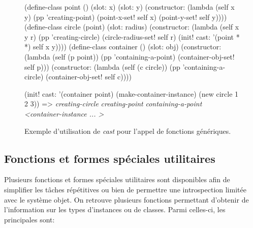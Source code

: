 \documentclass[12pt,oneside,letterpaper,francais]{book}
\newcommand{\schemeresult}[1]{{\it #1}}
\begin{document}
\begin{figure}[p!]
  \begin{schemecode}
(define-class point () (slot: x) (slot: y)
  (constructor: (lambda (self x y)
                  (pp 'creating-point)
                  (point-x-set! self x) (point-y-set! self y))))
(define-class circle (point) (slot: radius)
  (constructor: (lambda (self x y r)
                  (pp 'creating-circle)
                  (circle-radius-set! self r)
                  (init! cast: '(point * *) self x y))))
(define-class container () (slot: obj)
  (constructor: (lambda (self (p point))
                  (pp 'containing-a-point)
                  (container-obj-set! self p)))
  (constructor: (lambda (self (c circle))
                  (pp 'containing-a-circle)
                  (container-obj-set! self c))))

(init! cast: '(container point) (make-container-instance) (new circle 1 2 3))
  => \schemeresult{creating-circle}
     \schemeresult{creating-point}
     \schemeresult{containing-a-point}
     \schemeresult{\textless container-instance ... \textgreater}
  \end{schemecode}
  \caption{Exemple d'utilisation de \textit{cast} pour l'appel de
    fonctions génériques.}
  \label{OO:cast}
\end{figure}


\subsection{Fonctions et formes spéciales utilitaires}

Plusieurs fonctions et formes spéciales utilitaires sont disponibles
afin de simplifier les tâches répétitives ou bien de permettre une
introspection limitée avec le système objet. On retrouve plusieurs
fonctions permettant d'obtenir de l'information sur les types
d'instances ou de classes. Parmi celles-ci, les principales sont:
\end{document}

